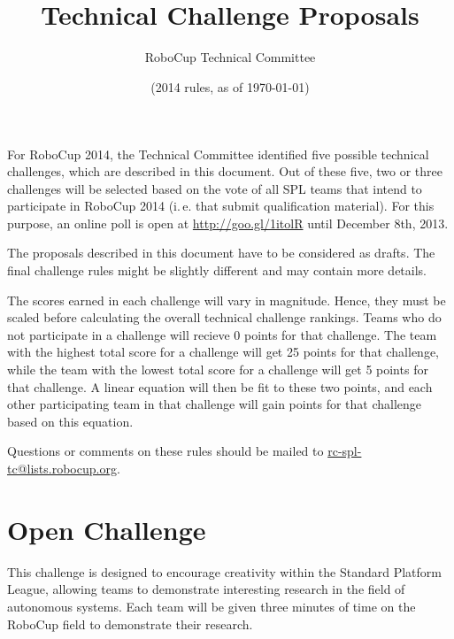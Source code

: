 \documentclass[12pt]{article}
\title{\leaguename \\ Technical Challenge Proposals}
\author{RoboCup Technical Committee}
\date{(2014 rules, as of \today)}
\newcommand{\ie}{\mbox{i.\,e.}\xspace}
\begin{document}
\maketitle

For RoboCup 2014, the Technical Committee identified five possible technical challenges, which are described in this document. Out of these five, two or three challenges will be selected based on the vote of all SPL teams that intend to participate in RoboCup 2014 (\ie that submit qualification material). For this purpose, an online poll is open at {\small \url{http://goo.gl/1itolR}} until December 8th, 2013.

The proposals described in this document have to be considered as drafts. The final challenge rules might be slightly different and may contain more details.

The scores earned in each challenge will vary in magnitude.  Hence, they must be scaled before calculating the overall technical challenge rankings.  Teams who do not participate in a challenge will recieve 0 points for that challenge.  The team with the highest total score for a challenge will get 25 points for that challenge, while the team with the lowest total score for a challenge will get 5 points for that challenge.  A linear equation will then be fit to these two points, and each other participating team in that challenge will gain points for that challenge based on this equation.

Questions or comments on these rules should be mailed to {\small \url{rc-spl-tc@lists.robocup.org}}.

\vfill

\renewcommand\contentsname{Challenges}
\tableofcontents
\setcounter{tocdepth}{1}

\thispagestyle{fancy}

\clearpage

\cfoot{\thepage}
\setcounter{page}{1}






\section{Open Challenge}
\newcommand{\openMinNum}{three}

This challenge is designed to encourage creativity within the Standard 
Platform League, allowing teams to demonstrate interesting research in 
the field of autonomous systems. Each team will be given \openMinNum{} 
minutes of time on the RoboCup field to demonstrate their research.
\end{document}
